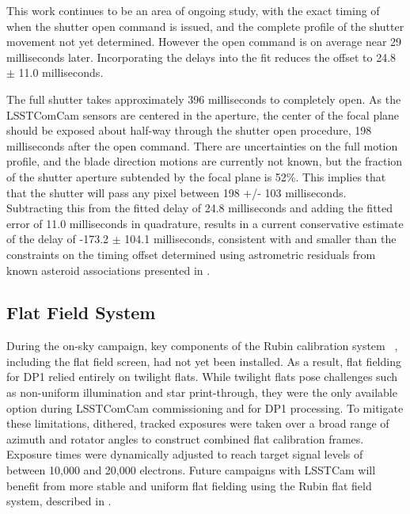 This work continues to be an area of ongoing study, with the exact timing of when the shutter open command is issued, and the complete profile of the shutter movement not yet determined. 
However the open command is on average near 29 milliseconds later. Incorporating the delays into the fit reduces the offset to 24.8 $\pm$ 11.0 milliseconds.

The full shutter takes approximately 396 milliseconds to completely open.  
As the \gls{LSSTComCam} sensors are centered in the aperture, the center of the focal plane should be exposed about half-way through the shutter open procedure, 198 milliseconds after the open command. 
There are uncertainties on the full motion profile, and the blade direction motions are currently not known, but the fraction of the shutter aperture subtended by the focal plane is 52\%. 
This implies that that the shutter will pass any pixel between 198 +/- 103 milliseconds.  
Subtracting this from the fitted delay of 24.8 milliseconds and adding the fitted error of 11.0 milliseconds in quadrature, results in a current conservative estimate of the delay of -173.2 $\pm$ 104.1 milliseconds, consistent with and smaller than the constraints on the timing offset determined using astrometric residuals from known asteroid associations presented in .

\subsection{Flat Field System}
\label{ssec:flat_field_system}
During the on-sky campaign, key components of the Rubin calibration system ~\citep{2022SPIE12182E..0RI}, including the flat field screen, had not yet been installed.
As a result, flat fielding for \gls{DP1} relied entirely on twilight flats.
While twilight flats pose challenges such as non-uniform illumination and star print-through, they were the only available option during \gls{LSSTComCam} commissioning and for \gls{DP1} processing.
To mitigate these limitations, dithered, tracked exposures were taken over a broad range of azimuth and rotator angles to construct combined flat \gls{calibration} frames.
Exposure times were dynamically adjusted to reach target signal levels of between 10,000 and 20,000 electrons.
Future campaigns with \gls{LSSTCam} will benefit from more stable and uniform flat fielding using the Rubin flat field system, described in \citet{SITCOMTN-086}.
%
